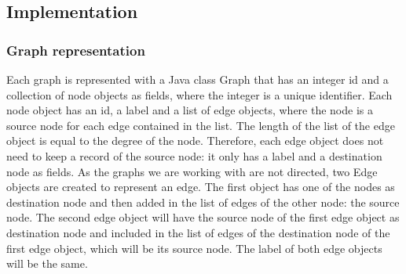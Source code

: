 \documentclass{l4proj}
\theoremstyle{definition}
\begin{document}
\subsection{Implementation}
\label{path-index:implementation}
\subsubsection{Graph representation}
\label{path-index:graph-representation}
	Each graph is represented with a Java class \textrm{Graph} that has an integer id and a collection of node objects as fields, where the integer is a unique identifier. Each node object has an id, a label and a list of edge objects, where the node is a source node for each edge contained in the list. The length of the list of the edge object is equal to the degree of the node. Therefore, each edge object does not need to keep a record of the source node: it only has a label and a destination node as fields. As the graphs we are working with are not directed, two Edge objects are created to represent an edge. The first object has one of the nodes as destination node and then added in the list of edges of the other node: the source node. The second edge object will have the source node of the first edge object as destination node and included in the list of edges of the destination node of the first edge object, which will be its source node. The label of both edge objects will be the same.\par
\end{document}
